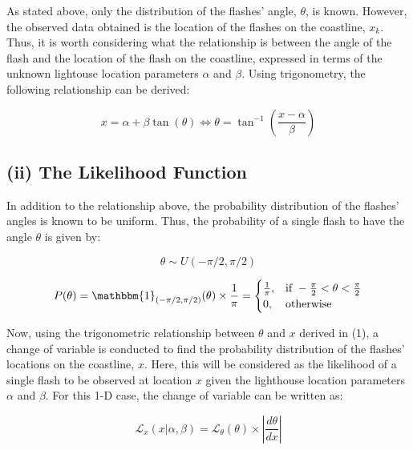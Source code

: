 \documentclass[12pt]{report} %
\begin{document}
As stated above, only the distribution of the flashes' angle, $\theta$, is known. However, the observed data obtained is the location of the flashes on the coastline, $x_{k}$. Thus, it is worth considering what the relationship is between the angle of the flash and the location of the flash on the coastline, expressed in terms of the unknown lightouse location parameters $\alpha$ and $\beta$. Using trigonometry, the following relationship can be derived:

\begin{equation}
    x = \alpha + \beta \tan(\theta) \iff \theta = \tan^{-1}\left(\frac{x - \alpha}{\beta}\right)
\end{equation}

\subsection*{(ii) The Likelihood Function}

In addition to the relationship above, the probability distribution of the flashes' angles is known to be uniform. Thus, the probability of a single flash to have the angle $\theta$ is given by:

\begin{equation}
    \theta \sim U(-\pi/2, \pi/2)
\end{equation}

\begin{equation}
    P(\theta) = \mathbbm{1}_{(-\pi/2, \pi/2)}(\theta) \times \frac{1}{\pi} = \begin{cases} \frac{1}{\pi}, & \text{if } -\frac{\pi}{2} < \theta < \frac{\pi}{2} \\ 0, & \text{otherwise} \end{cases}
\end{equation}

Now, using the trigonometric relationship between $\theta$ and $x$ derived in (1), a change of variable is conducted to find the probability distribution of the flashes' locations on the coastline, $x$. Here, this will be considered as the likelihood of a single flash to be observed at location $x$ given the lighthouse location parameters $\alpha$ and $\beta$. For this 1-D case, the change of variable can be written as:

\begin{equation}
    \mathcal{L}_{x}(x|\alpha, \beta) = \mathcal{L}_{\theta}(\theta) \times \left| \frac{d\theta}{dx} \right|
\end{equation}
\end{document}
